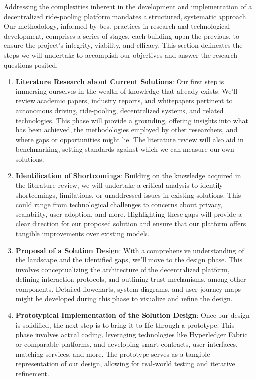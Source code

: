 Addressing the complexities inherent in the development and implementation of a decentralized ride-pooling platform mandates a structured, systematic approach. Our methodology, informed by best practices in research and technological development, comprises a series of stages, each building upon the previous, to ensure the project's integrity, viability, and efficacy. This section delineates the steps we will undertake to accomplish our objectives and answer the research questions posited.

\begin{enumerate}
    \item \textbf{Literature Research about Current Solutions}: 
    Our first step is immersing ourselves in the wealth of knowledge that already exists. We'll review academic papers, industry reports, and whitepapers pertinent to autonomous driving, ride-pooling, decentralized systems, and related technologies. This phase will provide a grounding, offering insights into what has been achieved, the methodologies employed by other researchers, and where gaps or opportunities might lie. The literature review will also aid in benchmarking, setting standards against which we can measure our own solutions.

    \item \textbf{Identification of Shortcomings}: 
    Building on the knowledge acquired in the literature review, we will undertake a critical analysis to identify shortcomings, limitations, or unaddressed issues in existing solutions. This could range from technological challenges to concerns about privacy, scalability, user adoption, and more. Highlighting these gaps will provide a clear direction for our proposed solution and ensure that our platform offers tangible improvements over existing models.

    \item \textbf{Proposal of a Solution Design}:
    With a comprehensive understanding of the landscape and the identified gaps, we'll move to the design phase. This involves conceptualizing the architecture of the decentralized platform, defining interaction protocols, and outlining trust mechanisms, among other components. Detailed flowcharts, system diagrams, and user journey maps might be developed during this phase to visualize and refine the design.

    \item \textbf{Prototypical Implementation of the Solution Design}: 
    Once our design is solidified, the next step is to bring it to life through a prototype. This phase involves actual coding, leveraging technologies like Hyperledger Fabric or comparable platforms, and developing smart contracts, user interfaces, matching services, and more. The prototype serves as a tangible representation of our design, allowing for real-world testing and iterative refinement.


\end{enumerate}
